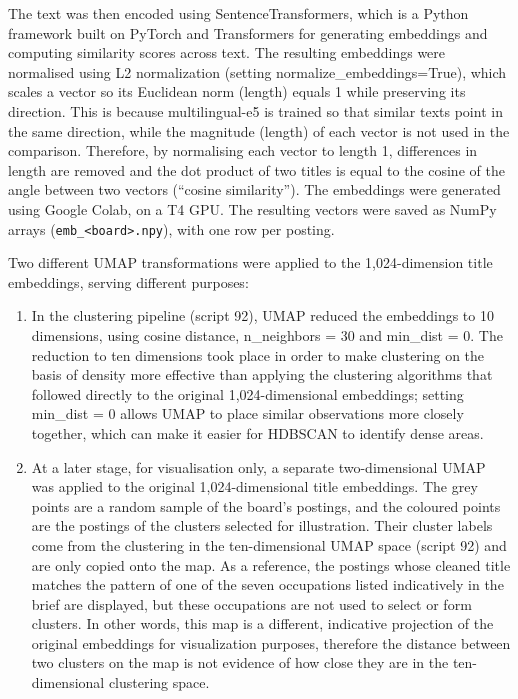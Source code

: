 \documentclass[
  letterpaper,
  DIV=11,
  numbers=noendperiod,
  sfdefaults=false]{scrartcl}
\providecommand{\tightlist}{%
  \setlength{\itemsep}{0pt}\setlength{\parskip}{0pt}}
\begin{document}
The text was then encoded using SentenceTransformers, which is a Python
framework built on PyTorch and Transformers for generating embeddings
and computing similarity scores across text. The resulting embeddings
were normalised using L2 normalization (setting
normalize\_embeddings=True), which scales a vector so its Euclidean norm
(length) equals 1 while preserving its direction. This is because
multilingual-e5 is trained so that similar texts point in the same
direction, while the magnitude (length) of each vector is not used in
the comparison. Therefore, by normalising each vector to length 1,
differences in length are removed and the dot product of two titles is
equal to the cosine of the angle between two vectors (``cosine
similarity''). The embeddings were generated using Google Colab, on a T4
GPU. The resulting vectors were saved as NumPy arrays
(\texttt{emb\_\textless{}board\textgreater{}.npy}), with one row per
posting.

Two different UMAP transformations were applied to the 1,024-dimension
title embeddings, serving different purposes:

\begin{enumerate}
\def\labelenumi{(\alph{enumi})}
\tightlist
\item
  In the clustering pipeline (script 92), UMAP reduced the embeddings to
  10 dimensions, using cosine distance, n\_neighbors = 30 and min\_dist
  = 0. The reduction to ten dimensions took place in order to make
  clustering on the basis of density more effective than applying the
  clustering algorithms that followed directly to the original
  1,024-dimensional embeddings; setting min\_dist = 0 allows UMAP to
  place similar observations more closely together, which can make it
  easier for HDBSCAN to identify dense areas.
\item
  At a later stage, for visualisation only, a separate two-dimensional
  UMAP was applied to the original 1,024-dimensional title embeddings.
  The grey points are a random sample of the board's postings, and the
  coloured points are the postings of the clusters selected for
  illustration. Their cluster labels come from the clustering in the
  ten-dimensional UMAP space (script 92) and are only copied onto the
  map. As a reference, the postings whose cleaned title matches the
  pattern of one of the seven occupations listed indicatively in the
  brief are displayed, but these occupations are not used to select or
  form clusters. In other words, this map is a different, indicative
  projection of the original embeddings for visualization purposes,
  therefore the distance between two clusters on the map is not evidence
  of how close they are in the ten-dimensional clustering space.
\end{enumerate}
\end{document}
